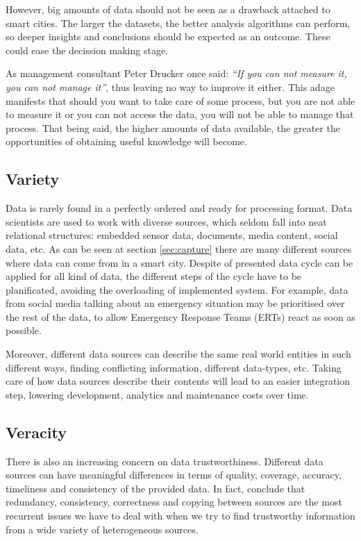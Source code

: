 
However, big amounts of data should not be seen as a drawback attached to smart cities. The larger the datasets, the better analysis algorithms can perform, so deeper insights and conclusions should be expected as an outcome. These could ease the decission making stage.

As management consultant Peter Drucker once said: \textit{``If you can not measure it, you can not manage it''}, thus leaving no way to improve it either. This adage manifests that should you want to take care of some process, but you are not able to measure it or you can not access the data, you will not be able to manage that process. That being said, the higher amounts of data available, the greater the opportunities of obtaining useful knowledge will become.

\subsection{Variety}

Data is rarely found in a perfectly ordered and ready for processing format. Data scientists are used to work with diverse sources, which seldom fall into neat relational structures: embedded sensor data, documents, media content, social data, etc. As can be seen at section \ref{sec:capture} there are many different sources where data can come from in a smart city. Despite of presented data cycle can be applied for all kind of data, the different steps of the cycle have to be planificated, avoiding the overloading of implemented system. For example, data from social media talking about an emergency situation may be prioritised over the rest of the data, to allow Emergency Response Teams (ERTs) react as soon as possible.

Moreover, different data sources can describe the same real world entities in such different ways, finding conflicting information, different data-types, etc. Taking care of how data sources describe their contents will lead to an easier integration step, lowering development, analytics and maintenance costs over time.

\subsection{Veracity}

There is also an increasing concern on data trustworthiness. Different data sources can have meaningful differences in terms of quality, coverage, accuracy, timeliness and consistency of the provided data. In fact, \cite{xian_truth_2013} conclude that redundancy, consistency, correctness and copying between sources are the most recurrent issues we have to deal with when we try to find trustworthy information from a wide variety of heterogeneous sources.

